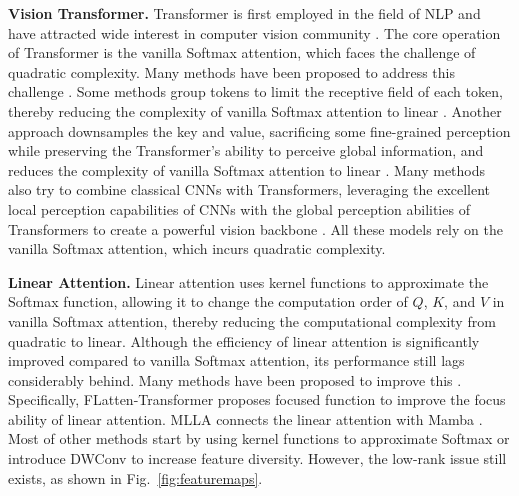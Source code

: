 \documentclass[10pt,twocolumn,letterpaper]{article}
\begin{document}
\textbf{Vision Transformer.} Transformer is first employed in the field of NLP \cite{vaswani2017attention} and have attracted wide interest in computer vision community \cite{dosovitskiy2020image,gao2022doubly,wu2021cvt,zhang2021multi}. The core operation of Transformer is the vanilla Softmax attention, which faces the challenge of quadratic complexity. Many methods have been proposed to address this challenge \cite{ding2022davit,fan2023lightweight,guo2022visual,hassani2023neighborhood,hatamizadeh2023global,chen2022regionvit,ren2022shunted,xia2022vision}. Some methods group tokens to limit the receptive field of each token, thereby reducing the complexity of vanilla Softmax attention to linear \cite{liu2021swin,dong2022cswin,fan2024semantic,yang2021focal,wang2022crossformer,tang2022quadtree,huang2022orthogonal,lin2023scale}. Another approach downsamples the key and value, sacrificing some fine-grained perception while preserving the Transformer's ability to perceive global information, and reduces the complexity of vanilla Softmax attention to linear \cite{chen2022regionvit,ding2022davit,fan2023lightweight,wang2021pyramid,wang2022pvtv2,ren2022shunted}. Many methods also try to combine classical CNNs with Transformers, leveraging the excellent local perception capabilities of CNNs with the global perception abilities of Transformers to create a powerful vision backbone \cite{dai2021coatnet,fan2023rethinking,fan2022lightweight,guo2022visual,hou2022conv2former,li2022contextual,liu2022convnet,rao2022hornet,si2022inception}. All these models rely on the vanilla Softmax attention, which incurs quadratic complexity.

\textbf{Linear Attention.} Linear attention uses kernel functions to approximate the Softmax function, allowing it to change the computation order of $Q$, $K$, and $V$ in vanilla Softmax attention, thereby reducing the computational complexity from quadratic to linear. Although the efficiency of linear attention is significantly improved compared to vanilla Softmax attention, its performance still lags considerably behind. Many methods have been proposed to improve this \cite{han2023flatten,han2024demystify,lu2024softmax,shen2021efficient,you2023castling,zhu2023biformer}. Specifically, FLatten-Transformer \cite{han2023flatten} proposes focused function to improve the focus ability of linear attention. MLLA \cite{han2024demystify} connects the linear attention with Mamba \cite{gu2023mamba}. Most of other methods start by using kernel functions to approximate Softmax or introduce DWConv to increase feature diversity. However, the low-rank issue still exists, as shown in Fig.~\ref{fig:featuremaps}.
\end{document}
